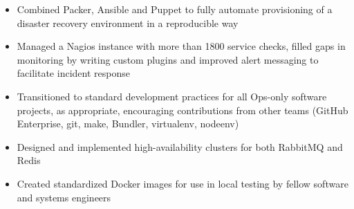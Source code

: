 \documentclass[10pt,letterpaper]{article}
\begin{document}
{\begin{itemize}
      capabilities (Python, Flask, YAML, JSON)
\item Combined Packer, Ansible and Puppet to fully automate provisioning of a
      disaster recovery environment in a reproducible way
\item Managed a Nagios instance with more than 1800 service checks, filled
      gaps in monitoring by writing custom plugins and improved alert
      messaging to facilitate incident response
\item Transitioned to standard development practices for all Ops-only software
      projects, as appropriate, encouraging contributions from other teams
      (GitHub Enterprise, git, make, Bundler, virtualenv, nodeenv)
\item Designed and implemented high-availability clusters for both RabbitMQ
      and Redis
\item Created standardized Docker images for use in local testing by fellow
      software and systems engineers
\end{itemize}
}
\end{document}

